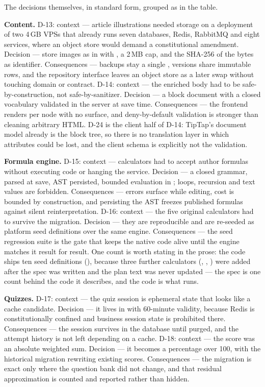 The decisions themselves, in standard form, grouped as in the table.

\textbf{Content.} D-13: context --- article illustrations needed storage on a
deployment of two 4\,GB VPSs that already runs seven databases, Redis, RabbitMQ
and eight services, where an object store would demand a constitutional amendment.
Decision --- store images as  in  with
, a 2\,MB cap, and the SHA-256 of the bytes as identifier.
Consequences --- backups stay a single , versions share immutable
rows, and the repository interface leaves an object store as a later swap without
touching domain or contract. D-14: context --- the enriched body had to be
safe-by-construction, not safe-by-sanitizer. Decision --- a  block
document with a closed vocabulary validated in the server at save time.
Consequences --- the frontend renders per node with no  surface,
and deny-by-default validation is stronger than cleaning arbitrary HTML. D-24 is
the client half of D-14: TipTap's document model already is the block tree, so
there is no translation layer in which attributes could be lost, and the client
schema is explicitly not the validation.

\textbf{Formula engine.} D-15: context --- calculators had to accept author
formulas without executing code or hanging the service. Decision --- a closed
grammar, parsed at save, AST persisted, bounded evaluation in
; loops, recursion and text values are forbidden.
Consequences --- errors surface while editing, cost is bounded by construction,
and persisting the AST freezes published formulas against silent
reinterpretation. D-16: context --- the five original calculators had to survive
the migration. Decision --- they are reproducible and are re-seeded as platform
seed definitions over the same engine. Consequences --- the seed regression suite
is the gate that keeps the native code alive until the engine matches it
result for result. One count is worth stating in the prose: the code ships ten
seed definitions (),
because three further calculators (, ,
) were added after the spec was written and the plan text was never
updated --- the spec is one count behind the code it describes, and the code is
what runs.

\textbf{Quizzes.} D-17: context --- the quiz session is ephemeral state that looks
like a cache candidate. Decision --- it lives in  with
60-minute validity, because Redis is constitutionally confined and business
session state is prohibited there. Consequences --- the session survives in the
database until purged, and the attempt history is not left depending on a cache.
D-18: context --- the score was an absolute weighted sum. Decision --- it becomes
a percentage over 100, with the historical migration rewriting existing scores.
Consequences --- the migration is exact only where the question bank did not
change, and that residual approximation is counted and reported rather than
hidden.

